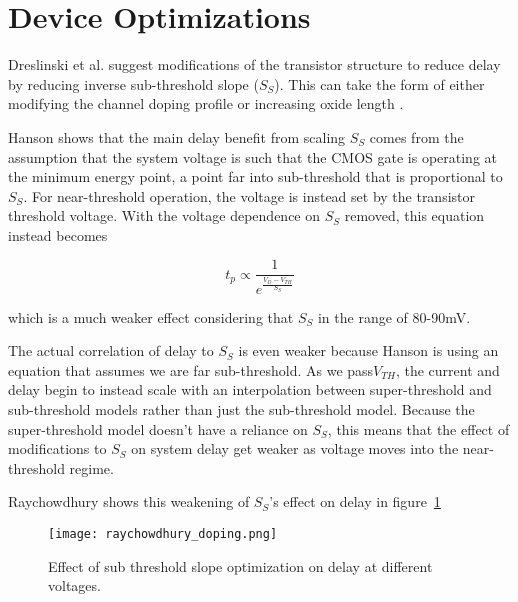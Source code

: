 
\section{Device Optimizations}
Dreslinski et al. \cite{Dreslinski:2010ez} suggest modifications of the transistor structure to reduce delay by reducing inverse sub-threshold slope ($S_S$). 
This can take the form of either modifying the channel doping profile \cite{Paul:2004cx} or increasing oxide length \cite{Hanson:2007uu}.

Hanson shows that the main delay benefit from scaling $S_S$ comes from the assumption that the system voltage is such that the CMOS gate is operating at the minimum energy point, a point far into sub-threshold that is proportional to $S_S$. 
For near-threshold operation, the voltage is instead set by the transistor threshold voltage. 
With the voltage dependence on $S_S$ removed, this equation instead becomes

\begin{equation}
t_p \propto \frac{1}{e^\frac{V_{D}-V_{TH}}{S_S}}
\end{equation} 

which is a much weaker effect considering that $S_S$ in the range of 80-90mV. 

The actual correlation of delay to $S_S$ is even weaker because Hanson is using an equation that assumes we are far sub-threshold. 
As we pass$ V_{TH}$, the current and delay begin to instead scale with an interpolation between super-threshold and sub-threshold models rather than just the sub-threshold model. 
Because the super-threshold model doesn't have a reliance on $S_S$, this means that the effect of modifications to $S_S$ on system delay get weaker as voltage moves into the near-threshold regime.

 Raychowdhury \cite{Raychowdhury:2006fu} shows this weakening of $S_S$'s effect on delay in figure~\ref{fig:doping}
  
\begin{figure}[thpb]
    \centering
    \texttt{[image: raychowdhury\_doping.png]}
    \caption{Effect of sub threshold slope optimization on delay at different voltages.~\cite{Raychowdhury:2006fu}}
    \label{fig:doping}
\end{figure}
 